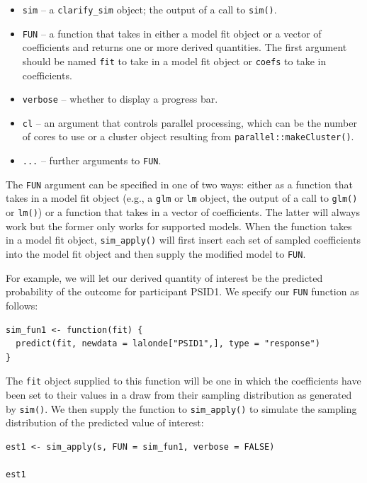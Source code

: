 \begin{itemize}
\item
  \texttt{sim} -- a \texttt{clarify\_sim} object; the output of a call to \texttt{sim()}.
\item
  \texttt{FUN} -- a function that takes in either a model fit object or a vector of coefficients and returns one or more derived quantities. The first argument should be named \texttt{fit} to take in a model fit object or \texttt{coefs} to take in coefficients.
\item
  \texttt{verbose} -- whether to display a progress bar.
\item
  \texttt{cl} -- an argument that controls parallel processing, which can be the number of cores to use or a cluster object resulting from \texttt{parallel::makeCluster()}.
\item
  \texttt{...} -- further arguments to \texttt{FUN}.
\end{itemize}

The \texttt{FUN} argument can be specified in one of two ways: either as a function that takes in a model fit object (e.g., a \texttt{glm} or \texttt{lm} object, the output of a call to \texttt{glm()} or \texttt{lm()}) or a function that takes in a vector of coefficients. The latter will always work but the former only works for supported models. When the function takes in a model fit object, \texttt{sim\_apply()} will first insert each set of sampled coefficients into the model fit object and then supply the modified model to \texttt{FUN}.

For example, we will let our derived quantity of interest be the predicted probability of the outcome for participant PSID1. We specify our \texttt{FUN} function as follows:

\begin{verbatim}
sim_fun1 <- function(fit) {
  predict(fit, newdata = lalonde["PSID1",], type = "response")
}
\end{verbatim}

The \texttt{fit} object supplied to this function will be one in which the coefficients have been set to their values in a draw from their sampling distribution as generated by \texttt{sim()}. We then supply the function to \texttt{sim\_apply()} to simulate the sampling distribution of the predicted value of interest:

\begin{verbatim}
est1 <- sim_apply(s, FUN = sim_fun1, verbose = FALSE)

est1
\end{verbatim}

